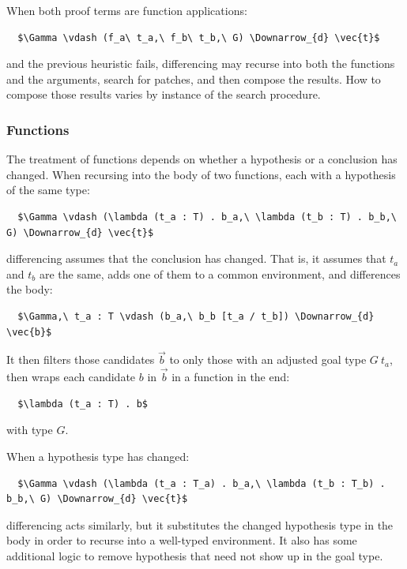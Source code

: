 When both proof terms are function applications:

\begin{lstlisting}
  $\Gamma \vdash (f_a\ t_a,\ f_b\ t_b,\ G) \Downarrow_{d} \vec{t}$
\end{lstlisting}
and the previous heuristic fails,
differencing may recurse into both the functions and the arguments, search for patches, and then compose the results.
How to compose those results varies by instance of the search procedure.

\subsubsection*{Functions} %
The treatment of functions depends on whether a hypothesis or a conclusion has changed.
When recursing into the body of two functions, each with a hypothesis of the same type:

\begin{lstlisting}
  $\Gamma \vdash (\lambda (t_a : T) . b_a,\ \lambda (t_b : T) . b_b,\ G) \Downarrow_{d} \vec{t}$
\end{lstlisting}
differencing assumes that the conclusion has changed.
That is, it assumes that $t_a$ and $t_b$ are the same, adds one of them to a common environment,
and differences the body:

\begin{lstlisting}
  $\Gamma,\ t_a : T \vdash (b_a,\ b_b [t_a / t_b]) \Downarrow_{d} \vec{b}$
\end{lstlisting}
It then filters those candidates $\vec{b}$ to only those with an adjusted goal type $G\ t_a$,
then wraps each candidate $b$ in $\vec{b}$ in a function in the end:

\begin{lstlisting}
  $\lambda (t_a : T) . b$
\end{lstlisting}
with type $G$.

When a hypothesis type has changed:

\begin{lstlisting}
  $\Gamma \vdash (\lambda (t_a : T_a) . b_a,\ \lambda (t_b : T_b) . b_b,\ G) \Downarrow_{d} \vec{t}$
\end{lstlisting}
differencing acts similarly, but it substitutes the changed hypothesis type in the body in order to recurse into a well-typed environment.
It also has some additional logic to remove hypothesis that need not show up in the goal type.

